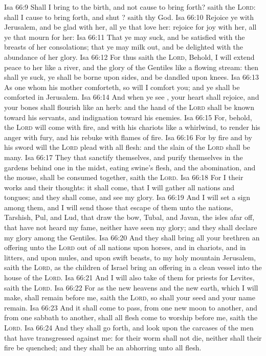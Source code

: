 \vs Isa 66:9 Shall I bring to the birth, and not cause to bring forth? saith the \textsc{Lord}: shall I cause to bring forth, and shut ? saith thy God.
\vs Isa 66:10 Rejoice ye with Jerusalem, and be glad with her, all ye that love her: rejoice for joy with her, all ye that mourn for her:
\vs Isa 66:11 That ye may suck, and be satisfied with the breasts of her consolations; that ye may milk out, and be delighted with the abundance of her glory.
\vs Isa 66:12 For thus saith the \textsc{Lord}, Behold, I will extend peace to her like a river, and the glory of the Gentiles like a flowing stream: then shall ye suck, ye shall be borne upon  sides, and be dandled upon  knees.
\vs Isa 66:13 As one whom his mother comforteth, so will I comfort you; and ye shall be comforted in Jerusalem.
\vs Isa 66:14 And when ye see , your heart shall rejoice, and your bones shall flourish like an herb: and the hand of the \textsc{Lord} shall be known toward his servants, and  indignation toward his enemies.
\vs Isa 66:15 For, behold, the \textsc{Lord} will come with fire, and with his chariots like a whirlwind, to render his anger with fury, and his rebuke with flames of fire.
\vs Isa 66:16 For by fire and by his sword will the \textsc{Lord} plead with all flesh: and the slain of the \textsc{Lord} shall be many.
\vs Isa 66:17 They that sanctify themselves, and purify themselves in the gardens behind one  in the midst, eating swine's flesh, and the abomination, and the mouse, shall be consumed together, saith the \textsc{Lord}.
\vs Isa 66:18 For I  their works and their thoughts: it shall come, that I will gather all nations and tongues; and they shall come, and see my glory.
\vs Isa 66:19 And I will set a sign among them, and I will send those that escape of them unto the nations,  Tarshish, Pul, and Lud, that draw the bow,  Tubal, and Javan,  the isles afar off, that have not heard my fame, neither have seen my glory; and they shall declare my glory among the Gentiles.
\vs Isa 66:20 And they shall bring all your brethren  an offering unto the \textsc{Lord} out of all nations upon horses, and in chariots, and in litters, and upon mules, and upon swift beasts, to my holy mountain Jerusalem, saith the \textsc{Lord}, as the children of Israel bring an offering in a clean vessel into the house of the \textsc{Lord}.
\vs Isa 66:21 And I will also take of them for priests  for Levites, saith the \textsc{Lord}.
\vs Isa 66:22 For as the new heavens and the new earth, which I will make, shall remain before me, saith the \textsc{Lord}, so shall your seed and your name remain.
\vs Isa 66:23 And it shall come to pass,  from one new moon to another, and from one sabbath to another, shall all flesh come to worship before me, saith the \textsc{Lord}.
\vs Isa 66:24 And they shall go forth, and look upon the carcases of the men that have transgressed against me: for their worm shall not die, neither shall their fire be quenched; and they shall be an abhorring unto all flesh.
